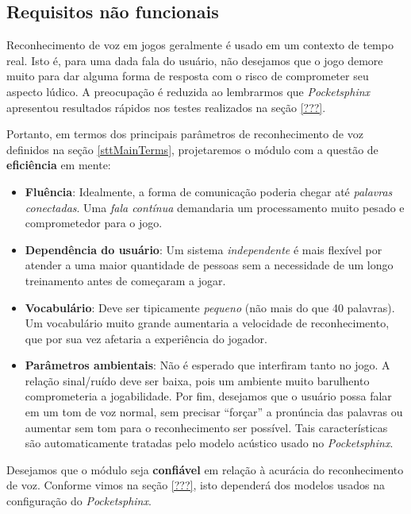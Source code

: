 \subsection{Requisitos não funcionais}


Reconhecimento de voz em jogos geralmente é usado em um contexto de tempo real. Isto é, para uma dada fala do usuário, não desejamos que o jogo demore muito para dar alguma forma de resposta com o risco de comprometer seu aspecto lúdico. A preocupação é reduzida ao lembrarmos que \textit{Pocketsphinx} apresentou resultados rápidos nos testes realizados na seção \ref{???}.

Portanto, em termos dos principais parâmetros de reconhecimento de voz definidos na seção \ref{sttMainTerms}, projetaremos o módulo com a questão de \textbf{eficiência} em mente:

\begin{itemize}
\item \textbf{Fluência}: Idealmente, a forma de comunicação poderia chegar até \emph{palavras conectadas}. Uma \textit{fala contínua} demandaria um processamento muito pesado e comprometedor para o jogo.

\item \textbf{Dependência do usuário}: Um sistema \emph{independente} é mais flexível por atender a uma maior quantidade de pessoas sem a necessidade de um longo treinamento antes de começaram a jogar.

\item \textbf{Vocabulário}: Deve ser tipicamente \emph{pequeno} (não mais do que 40 palavras). Um vocabulário muito grande aumentaria a velocidade de reconhecimento, que por sua vez afetaria a experiência do jogador.

\item \textbf{Parâmetros ambientais}: Não é esperado que interfiram tanto no jogo. A relação sinal/ruído deve ser baixa, pois um ambiente muito barulhento comprometeria a jogabilidade. Por fim, desejamos que o usuário possa falar em um tom de voz normal, sem precisar ``forçar'' a pronúncia das palavras ou aumentar sem tom para o reconhecimento ser possível. Tais características são automaticamente tratadas pelo modelo acústico usado no \textit{Pocketsphinx}.
\end{itemize}

Desejamos que o módulo seja \textbf{confiável} em relação à acurácia do reconhecimento de voz. Conforme vimos na seção \ref{???}, isto dependerá dos modelos usados na configuração do \textit{Pocketsphinx}.

